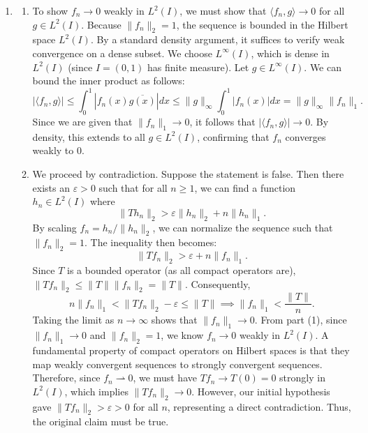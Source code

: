 \documentclass[10pt,a4paper]{article}
\begin{document}
\begin{enumerate}[label=\fbox{\arabic*}]
  \item %
        \begin{enumerate}[label=(\arabic*)]
          \item To show $f_n \to 0$ weakly in $L^2(I)$, we must show that $\langle f_n, g \rangle \to 0$ for all $g \in L^2(I)$.
          Because $\|f_n\|_2 = 1$, the sequence is bounded in the Hilbert space $L^2(I)$. By a standard density argument, it suffices to verify weak convergence on a dense subset. We choose $L^\infty(I)$, which is dense in $L^2(I)$ (since $I = (0, 1)$ has finite measure).
          Let $g \in L^\infty(I)$. We can bound the inner product as follows:
          \[
            |\langle f_n, g \rangle| \le \int_0^1 |f_n(x) \overline{g(x)}| dx \le \|g\|_\infty \int_0^1 |f_n(x)| dx = \|g\|_\infty \|f_n\|_1.
          \]
          Since we are given that $\|f_n\|_1 \to 0$, it follows that $|\langle f_n, g \rangle| \to 0$. By density, this extends to all $g \in L^2(I)$, confirming that $f_n$ converges weakly to $0$.

          \item We proceed by contradiction. Suppose the statement is false. Then there exists an $\varepsilon > 0$ such that for all $n \ge 1$, we can find a function $h_n \in L^2(I)$ where
          \[
            \|Th_n\|_2 > \varepsilon \|h_n\|_2 + n \|h_n\|_1.
          \]
          By scaling $f_n = h_n / \|h_n\|_2$, we can normalize the sequence such that $\|f_n\|_2 = 1$. The inequality then becomes:
          \[
            \|Tf_n\|_2 > \varepsilon + n \|f_n\|_1.
          \]
          Since $T$ is a bounded operator (as all compact operators are), $\|Tf_n\|_2 \le \|T\| \|f_n\|_2 = \|T\|$. Consequently,
          \[
            n \|f_n\|_1 < \|Tf_n\|_2 - \varepsilon \le \|T\| \implies \|f_n\|_1 < \frac{\|T\|}{n}.
          \]
          Taking the limit as $n \to \infty$ shows that $\|f_n\|_1 \to 0$. From part (1), since $\|f_n\|_1 \to 0$ and $\|f_n\|_2 = 1$, we know $f_n \to 0$ weakly in $L^2(I)$.
          A fundamental property of compact operators on Hilbert spaces is that they map weakly convergent sequences to strongly convergent sequences. Therefore, since $f_n \rightharpoonup 0$, we must have $Tf_n \to T(0) = 0$ strongly in $L^2(I)$, which implies $\|Tf_n\|_2 \to 0$.
          However, our initial hypothesis gave $\|Tf_n\|_2 > \varepsilon > 0$ for all $n$, representing a direct contradiction. Thus, the original claim must be true.
        \end{enumerate}


\end{enumerate}
\end{document}

